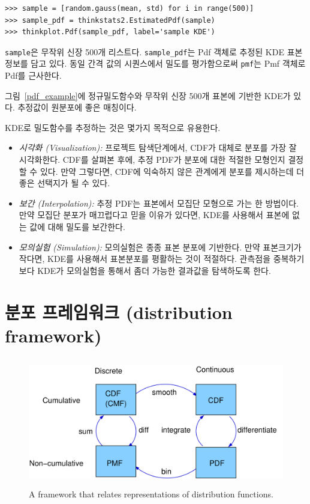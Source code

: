 \begin{verbatim}
>>> sample = [random.gauss(mean, std) for i in range(500)]
>>> sample_pdf = thinkstats2.EstimatedPdf(sample)
>>> thinkplot.Pdf(sample_pdf, label='sample KDE')
\end{verbatim}

\verb"sample"은 무작위 신장 500개 리스트다. 
\verb"sample_pdf"는 Pdf 객체로 추정된 KDE 표본정보를 담고 있다.
동일 간격 값의 시퀀스에서 밀도를 평가함으로써 {\tt pmf}는 Pmf 객체로 Pdf를 근사한다.

그림~\ref{pdf_example}에 정규밀도함수와 무작위 신장 500개 표본에 기반한 KDE가 있다. 추정값이 원분포에 좋은 매칭이다.

KDE로 밀도함수를 추정하는 것은 몇가지 목적으로 유용한다. 


\begin{itemize}

\item {\it 시각화 (Visualization):} 
  프로젝트 탐색단계에서, CDF가 대체로 분포를 가장 잘 시각화한다.
  CDF를 살펴본 후에, 추정 PDF가 분포에 대한 적절한 모형인지 결정할 수 있다.
  만약 그렇다면, CDF에 익숙하지 않은 관계에게 분포를 제시하는데 더 좋은 선택지가 될 수 있다.

\item {\it 보간 (Interpolation):} 
  추정 PDF는 표본에서 모집단 모형으로 가는 한 방법이다.
  만약 모집단 분포가 매끄럽다고 믿을 이유가 있다면, KDE를 사용해서 표본에 없는 값에 대해 밀도를 보간한다.

\item {\it 모의실험 (Simulation):} 
  모의실험은 종종 표본 분포에 기반한다. 
  만약 표본크기가 작다면, KDE를 사용해서 표본분포를 평활하는 것이 적절하다.
  관측점을 중복하기 보다 KDE가 모의실험을 통해서 좀더 가능한 결과값을 탐색하도록 한다.

\end{itemize}


\section{분포 프레임워크 (distribution framework)}

\begin{figure}
\centerline{\includegraphics[height=2.2in]{figs/distribution_functions.pdf}}
\caption{A framework that relates representations of distribution
functions.}
\label{dist_framework}
\end{figure}

